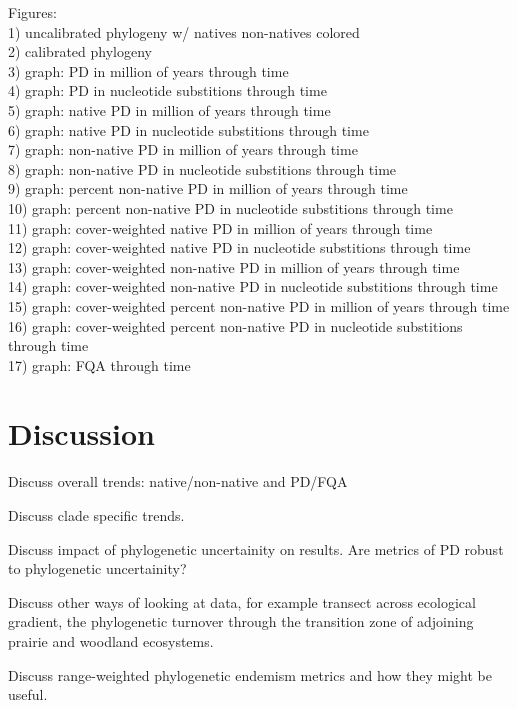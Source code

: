 \documentclass[twocolumn,superscriptaddress,showkeys]{revtex4}
\begin{document}
Figures: \\
1) uncalibrated phylogeny w/ natives non-natives colored \\
2) calibrated phylogeny \\
3) graph: PD in million of years through time \\
4) graph: PD in nucleotide substitions through time \\
5) graph: native PD in million of years through time \\
6) graph: native PD in nucleotide substitions through time \\
7) graph: non-native PD in million of years through time \\
8) graph: non-native PD in nucleotide substitions through time \\
9) graph: percent non-native PD in million of years through time \\
10) graph: percent non-native PD in nucleotide substitions through time \\
11) graph: cover-weighted native PD in million of years through time \\
12) graph: cover-weighted native PD in nucleotide substitions through time \\
13) graph: cover-weighted non-native PD in million of years through time \\
14) graph: cover-weighted non-native PD in nucleotide substitions through time \\
15) graph: cover-weighted percent non-native PD in million of years through time \\
16) graph: cover-weighted percent non-native PD in nucleotide substitions through time \\
17) graph: FQA through time

\section{Discussion}


Discuss overall trends: native/non-native and PD/FQA


Discuss clade specific trends.


Discuss impact of phylogenetic uncertainity on results. Are metrics of PD robust to phylogenetic uncertainity?


Discuss other ways of looking at data, for example transect across ecological gradient, 
the phylogenetic turnover through the transition zone of adjoining prairie and woodland ecosystems.


Discuss range-weighted phylogenetic endemism metrics and how they might be useful.
\end{document}
